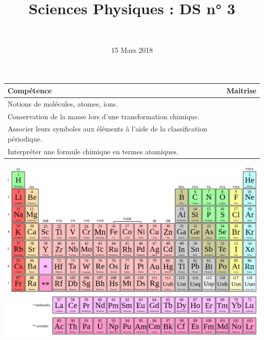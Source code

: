 \documentclass[a4paper,11pt]{exam}
\author{\ }
\date{15 Mars 2018}
\title{Sciences Physiques : DS n° 3}
\begin{document}
%	

	\maketitle
	
\begin{small}
	\begin{center}
		\begin{tabular}{|@{\ }l@{}|@{\ }c@{\ }|}
			\hline
			\textbf{Compétence} & \textbf{Maitrise} \\
			\hline
		Notions de molécules, atomes, ions. \ \ &  \ \ \ \\
			\hline
			Conservation de la masse lors d’une transformation chimique. &  \\
			\hline			
			Associer leurs symboles aux éléments à l’aide de la classification périodique. \ &  \\
			\hline
			Interpréter une formule chimique en termes atomiques. &  \\
			\hline
		\end{tabular}
	\end{center}
\end{small}	
	
	
\vspace*{-0.5cm}	

%





\newpage












\newpage




\newpage 





 
\newpage

\includegraphics [scale=0.5, angle= 90 ]{img/tableau} \label{LastPage}
\end{document}
